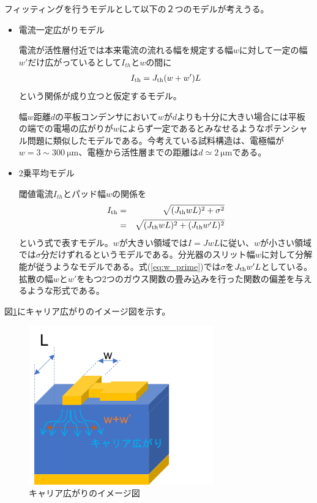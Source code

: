 フィッティングを行うモデルとして以下の２つのモデルが考えうる。
\begin{itemize}
\item 電流一定広がりモデル  

電流が活性層付近では本来電流の流れる幅を規定する幅$w$に対して一定の幅$w'$だけ広がっているとして$I_{th}$と$w$の間に
\begin{eqnarray}
I_{\rm{th}}=J_{\rm{th}}(w+w')L
\label{eq:denryu_hirogari}
\end{eqnarray}
という関係が成り立つと仮定するモデル。


幅$w$距離$d$の平板コンデンサにおいて$w$が$d$よりも十分に大きい場合には平板の端での電場の広がりが$w$によらず一定であるとみなせるようなポテンシャル問題に類似したモデルである。今考えている試料構造は、電極幅が$w=3\sim 300\ \si{\micro\metre}$、電極から活性層までの距離は$d\simeq 2\ \si{\micro\metre}$である。
\item 2乗平均モデル

閾値電流$I_{th}$とパッド幅$w$の関係を
\begin{eqnarray}
I_{\rm{th}}&=&\sqrt{(J_{\rm{th}}wL)^2+\sigma^2}\\
&=&\sqrt{(J_{\rm{th}}wL)^2+(J_{\rm{th}}w'L)^2}
\label{eq:w_prime}
\end{eqnarray}
という式で表すモデル。$w$が大きい領域では$I=JwL$に従い、$w$が小さい領域では$\sigma$分だけずれるというモデルである。分光器のスリット幅$w$に対して分解能が従うようなモデルである。式(\ref{eq:w_prime})では$\sigma$を$J_{\rm{th}}w'L$としている。拡散の幅$w$と$w'$をもつ2つのガウス関数の畳み込みを行った関数の偏差を与えるような形式である。
\end{itemize}
図\ref{fig:fig_3_1_w_prime_figure}にキャリア広がりのイメージ図を示す。
\begin{figure}[h]
	\centering
	\includegraphics[width=8cm]{figure/fig_3_1_w_prime_figure.png}
	\caption{キャリア広がりのイメージ図}
	\label{fig:fig_3_1_w_prime_figure}
\end{figure}



